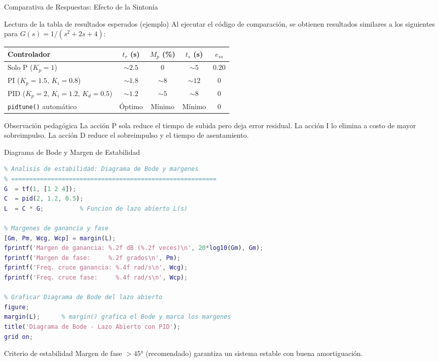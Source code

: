 \documentclass[aspectratio=169,xcolor=dvipsnames]{beamer}
\begin{document}
\begin{frame}{Comparativa de Respuestas: Efecto de la Sintonía}
    \footnotesize
    \begin{block}{Lectura de la tabla de resultados esperados (ejemplo)}
        Al ejecutar el código de comparación, se obtienen resultados similares a los siguientes para $G(s) = 1/(s^2+2s+4)$:
    \end{block}
    \vspace{0.4em}
    \begin{center}
    \begin{tabular}{lcccc}
        \toprule
        \textbf{Controlador} & $t_r$ (s) & $M_p$ (\%) & $t_s$ (s) & $e_{ss}$ \\
        \midrule
        Solo P ($K_p=1$) & $\sim 2.5$ & $0$ & $\sim 5$ & $0.20$ \\
        PI ($K_p=1.5$, $K_i=0.8$) & $\sim 1.8$ & $\sim 8$ & $\sim 12$ & $0$ \\
        PID ($K_p=2$, $K_i=1.2$, $K_d=0.5$) & $\sim 1.2$ & $\sim 5$ & $\sim 8$ & $0$ \\
        \texttt{pidtune()} automático & Óptimo & Mínimo & Mínimo & $0$ \\
        \bottomrule
    \end{tabular}
    \end{center}
    \vspace{0.3em}
    \begin{exampleblock}{Observación pedagógica}
        La acción P sola reduce el tiempo de subida pero deja error residual. La acción I lo elimina a costo de mayor sobreimpulso. La acción D reduce el sobreimpulso y el tiempo de asentamiento.
    \end{exampleblock}
\end{frame}

\begin{frame}[fragile]{Diagrama de Bode y Margen de Estabilidad}
\begin{lstlisting}[language=Matlab, style=MATLABStyle]
% =========================================================
% Analisis de estabilidad: Diagrama de Bode y margenes
% =========================================================
G  = tf(1, [1 2 4]);
C  = pid(2, 1.2, 0.5);
L  = C * G;          % Funcion de lazo abierto L(s)

% Margenes de ganancia y fase
[Gm, Pm, Wcg, Wcp] = margin(L);
fprintf('Margen de ganancia: %.2f dB (%.2f veces)\n', 20*log10(Gm), Gm);
fprintf('Margen de fase:     %.2f grados\n', Pm);
fprintf('Freq. cruce ganancia: %.4f rad/s\n', Wcg);
fprintf('Freq. cruce fase:     %.4f rad/s\n', Wcp);

% Graficar Diagrama de Bode del lazo abierto
figure;
margin(L);      % margin() grafica el Bode y marca los margenes
title('Diagrama de Bode - Lazo Abierto con PID');
grid on;
\end{lstlisting}
    \begin{exampleblock}{Criterio de estabilidad}
        Margen de fase $> 45°$ (recomendado) garantiza un sistema estable con buena amortiguación.
    \end{exampleblock}
\end{frame}
\end{document}
